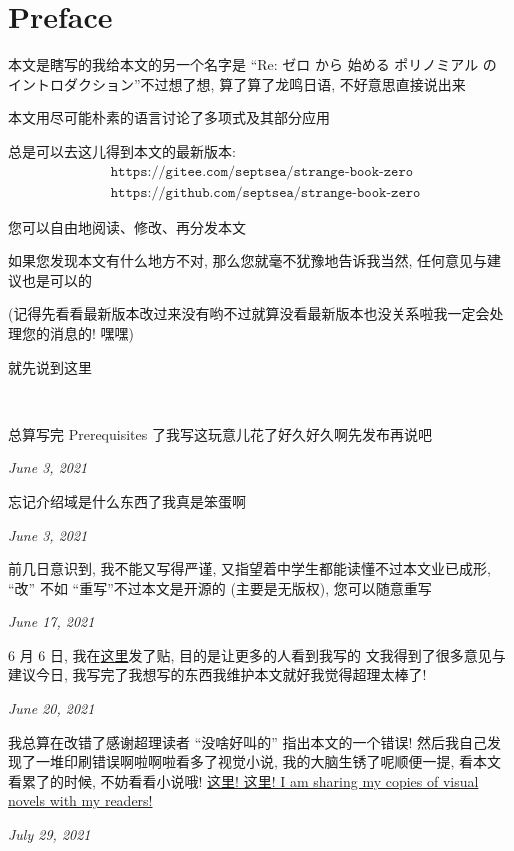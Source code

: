 \section*{Preface}

本文是瞎写的\period 我给本文的另一个名字是 ``Re: ゼロ から 始める ポリノミアル の イントロダクション''\period 不过想了想, 算了算了\period 龙鸣日语, 不好意思直接说出来\period

本文用尽可能朴素的语言讨论了多项式及其部分应用\period

总是可以去这儿得到本文的最新版本:
\begin{align*}
     & \texttt{https://gitee.com/septsea/strange-book-zero}  \\
     & \texttt{https://github.com/septsea/strange-book-zero}
\end{align*}

您可以自由地阅读、修改、再分发本文\period

如果您发现本文有什么地方不对, 那么您就毫不犹豫地告诉我\period 当然, 任何意见与建议也是可以的\period

(记得先看看最新版本改过来没有哟\period 不过就算没看最新版本也没关系啦\period 我一定会处理您的消息的! 嘿嘿\period)

就先说到这里\period

\ \

\providecommand{\appendDate}{}
\renewcommand{\appendDate}[1]{\par \hfill {\itshape \sffamily #1}}

\begin{remark}
    总算写完 Prerequisites 了\period 我写这玩意儿花了好久好久啊\period 先发布再说吧\period
    \appendDate{June 3, 2021}
\end{remark}

\begin{remark}
    忘记介绍域是什么东西了\period 我真是笨蛋啊\period
    \appendDate{June 3, 2021}
\end{remark}

\begin{remark}
    前几日意识到, 我不能又写得严谨, 又指望着中学生都能读懂\period 不过本文业已成形, ``改'' 不如 ``重写''\period 不过本文是开源的 (主要是无版权), 您可以随意重写\period
    \appendDate{June 17, 2021}
\end{remark}

\begin{remark}
    6 月 6 日, 我在\hyperref{https://chaoli.club/index.php/6396}{}{}{这里}发了贴, 目的是让更多的人看到我写的  文\period 我得到了很多意见与建议\period 今日, 我写完了我想写的东西\period 我维护本文就好\period 我觉得超理太棒了!
    \appendDate{June 20, 2021}
\end{remark}

\begin{remark}
    我总算在改错了\period 感谢超理读者 ``没啥好叫的'' 指出本文的一个错误! 然后我自己发现了一堆印刷错误\period 啊啦啊啦\period 看多了视觉小说, 我的大脑生锈了呢\period 顺便一提, 看本文看累了的时候, 不妨看看小说哦! \hyperref{https://gitee.com/septsea/ss}{}{}{这里! 这里! I am sharing my copies of visual novels with my readers!}
    \appendDate{July 29, 2021}
\end{remark}
